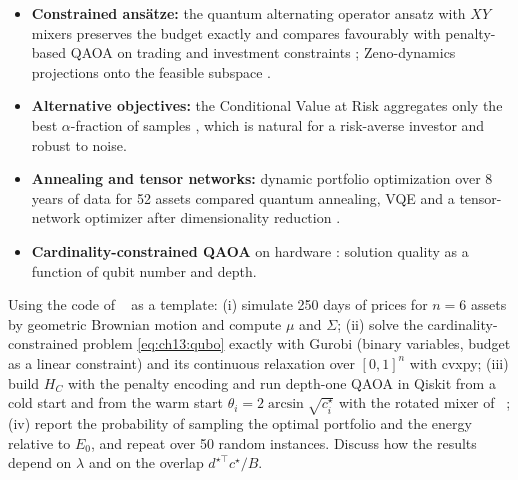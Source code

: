 \documentclass[handoutsbeamer.tex]{subfiles}
\begin{document}
\begin{frame}
\begin{itemize}\setlength\itemsep{0.25em}
    \item \textbf{Constrained ansätze:} the quantum alternating operator ansatz with $XY$ mixers preserves the budget exactly and compares favourably with penalty-based QAOA on trading and investment constraints \citep{Hodson2019}; Zeno-dynamics projections onto the feasible subspace \citep{herman23}.
    \item \textbf{Alternative objectives:} the Conditional Value at Risk aggregates only the best $\alpha$-fraction of samples \citep{Barkoutsos2020}, which is natural for a risk-averse investor and robust to noise.
    \item \textbf{Annealing and tensor networks:} dynamic portfolio optimization over 8 years of data for 52 assets compared quantum annealing, VQE and a tensor-network optimizer after dimensionality reduction \citep{mugel22}.
    \item \textbf{Cardinality-constrained QAOA} on hardware \citep{Brandhofer2023}: solution quality as a function of qubit number and depth.
\end{itemize}
\end{frame}

\begin{frame}
\begin{exe}
Using the code of \Chap~ as a template: (i) simulate 250 days of prices for $n = 6$ assets by geometric Brownian motion and compute $\mu$ and $\Sigma$; (ii) solve the cardinality-constrained problem \eqref{eq:ch13:qubo} exactly with Gurobi (binary variables, budget as a linear constraint) and its continuous relaxation over $[0,1]^n$ with cvxpy; (iii) build $H_C$ with the penalty encoding and run depth-one QAOA in Qiskit from a cold start and from the warm start $\theta_i = 2\arcsin\sqrt{c_i^\star}$ with the rotated mixer of \Chap~; (iv) report the probability of sampling the optimal portfolio and the energy relative to $E_0$, and repeat over 50 random instances. Discuss how the results depend on $\lambda$ and on the overlap $d^{\star\top}c^\star/B$.
\end{exe}
\end{frame}
\end{document}

